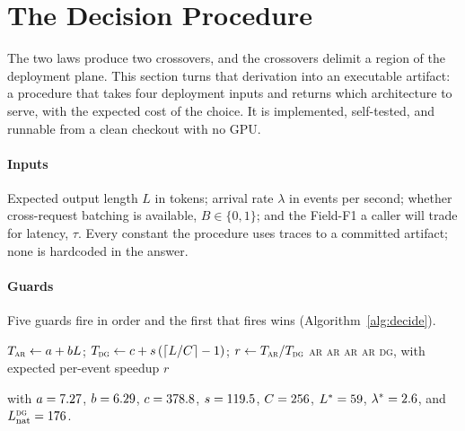 \section{The Decision Procedure}
\label{sec:decision}

The two laws produce two crossovers, and the crossovers delimit a region of
the deployment plane. This section turns that derivation into an executable
artifact: a procedure that takes four deployment inputs and returns which
architecture to serve, with the expected cost of the choice. It is
implemented, self-tested, and runnable from a clean checkout with no GPU.

\paragraph{Inputs}
Expected output length $L$ in tokens; arrival rate $\lambda$ in events per
second; whether cross-request batching is available, $B \in \{0,1\}$; and the
Field-F1 a caller will trade for latency, $\tau$. Every constant the procedure
uses traces to a committed artifact; none is hardcoded in the answer.

\paragraph{Guards}
Five guards fire in order and the first that fires wins
(Algorithm~\ref{alg:decide}).

\begin{algorithm}[H]
\caption{Decide which architecture to serve.}
\label{alg:decide}
\begin{algorithmic}[1]
\State $T_{\textsc{ar}} \gets a + bL$;\quad
       $T_{\textsc{dg}} \gets c + s\,(\lceil L/C\rceil - 1)$;\quad
       $r \gets T_{\textsc{ar}}/T_{\textsc{dg}}$
  \State \Return \textsc{ar}
  \State \Return \textsc{ar}
  \State \Return \textsc{ar}
  \State \Return \textsc{ar}
\Else
  \State \Return \textsc{dg}, with expected per-event speedup $r$
\EndIf
\end{algorithmic}
\end{algorithm}

\noindent
with $a = 7.27$, $b = 6.29$, $c = 378.8$, $s = 119.5$,
$C = 256$, $L^{*} = 59$, $\lambda^{*} =
2.6$, and $L^{\textsc{dg}}_{\mathrm{nat}} = 176$.

